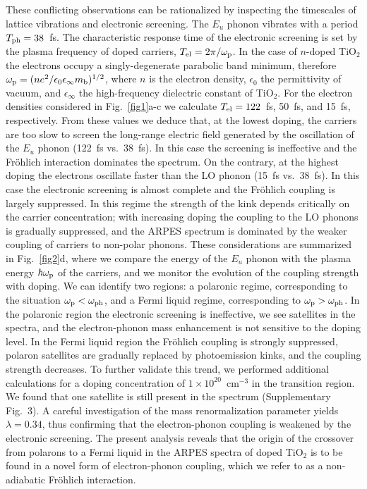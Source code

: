 \documentclass[12pt]{nature}
\begin{document}
These conflicting observations can be rationalized by inspecting the timescales of lattice vibrations 
and electronic screening. The $E_u$ phonon vibrates with a period $T_{\rm ph}=38$~fs. The characteristic 
response time of the electronic screening is set by the plasma frequency of doped carriers, $T_{\rm el} = 
2\pi/\omega_{\rm p}$. In the case of $n$-doped TiO$_2$ the electrons occupy a singly-degenerate parabolic 
band minimum, therefore $\omega_{\rm p}= (n e^2/\epsilon_0 \epsilon_\infty m_{\rm b})^{1/2}$, 
where $n$ is the electron density, $\epsilon_0$ the permittivity of vacuum, and 
$\epsilon_\infty$ the high-frequency dielectric constant of TiO$_2$\cite{Mahan}. For the electron 
densities considered in Fig.~\ref{fig1}a-c we calculate $T_{\rm el} = 122$~fs, 50~fs, and 15~fs, 
respectively. From these values we deduce that, at the lowest doping, the carriers are too slow to 
screen the long-range electric field generated by the oscillation of the $E_u$ phonon (122~fs vs.\ 
38~fs). In this case the screening is ineffective and the Fr\"ohlich interaction dominates the spectrum. 
On the contrary, at the highest doping the electrons oscillate faster than the LO phonon (15~fs vs.\ 
38~fs). In this case the electronic screening is almost complete and the Fr\"ohlich coupling is largely 
suppressed. In this regime the strength of the kink depends critically on the carrier concentration; 
with increasing doping the coupling to the LO phonons is gradually suppressed, and the ARPES spectrum is 
dominated by the weaker coupling of carriers to non-polar phonons\cite{Baumberger2016}. These considerations 
are summarized in Fig.~\ref{fig2}d, where we compare the energy of the $E_u$ phonon with the plasma energy 
$\hbar\omega_{\rm p}$ of the carriers, and we monitor the evolution of the coupling strength with doping. 
We can identify two regions: a  polaronic regime, corresponding to the situation $\omega_{\rm p}<
\omega_{\rm ph}$, and a  Fermi liquid regime, corresponding to $\omega_{\rm p} > \omega_{\rm ph}$. 
In the polaronic region the electronic screening is ineffective, we see satellites in the spectra, and 
the electron-phonon mass enhancement is not sensitive to the doping level. In the Fermi liquid region 
the Fr\"ohlich coupling is strongly suppressed, polaron satellites are gradually replaced by photoemission 
kinks, and the coupling strength decreases. To further validate this trend, we performed additional 
calculations for a doping concentration of $1\times10^{20}$~cm$^{-3}$ in the transition region. We 
found that one satellite is still present in the spectrum (Supplementary Fig.~3). A careful investigation 
of the mass renormalization parameter yields \mbox{$\lambda=0.34$}, thus confirming that the electron-phonon 
coupling is weakened by the electronic screening. The present analysis reveals that the origin of the 
crossover from polarons to a Fermi liquid in the ARPES spectra of doped TiO$_2$ is to be found in a 
novel form of electron-phonon coupling, which we refer to as a non-adiabatic Fr\"ohlich interaction.
\end{document}
